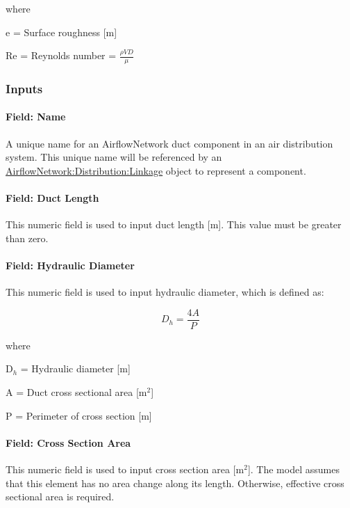 where

e = Surface roughness {[}m{]}

Re = Reynolds number = \(\frac{\rho VD}{\mu}\)

\subsubsection{Inputs}\label{inputs-15-001}

\paragraph{Field: Name}\label{field-name-17}

A unique name for an AirflowNetwork duct component in an air distribution system. This unique name will be referenced by an \hyperref[airflownetworkdistributionlinkage]{AirflowNetwork:Distribution:Linkage} object to represent a component.

\paragraph{Field: Duct Length}\label{field-duct-length}

This numeric field is used to input duct length {[}m{]}. This value must be greater than zero.

\paragraph{Field: Hydraulic Diameter}\label{field-hydraulic-diameter}

This numeric field is used to input hydraulic diameter, which is defined as:

\begin{equation}
{D_h} = \frac{{4A}}{P}
\end{equation}

where

D\(_{h}\) = Hydraulic diameter {[}m{]}

A = Duct cross sectional area {[}m\(^{2}\){]}

P = Perimeter of cross section {[}m{]}

\paragraph{Field: Cross Section Area}\label{field-cross-section-area}

This numeric field is used to input cross section area {[}m\(^{2}\){]}. The model assumes that this element has no area change along its length. Otherwise, effective cross sectional area is required.

